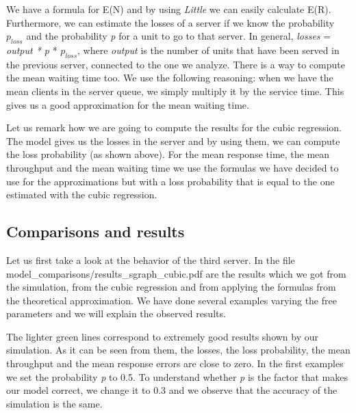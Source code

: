 \documentclass[12pt]{article}
\theoremstyle{plain}
\begin{document}
We have a formula for E(N) and by using \emph{Little} we can easily calculate
E(R). Furthermore, we can estimate the losses of a server if we know the
probability $p_{loss}$ and the probability \emph{p} for a unit to go to that
server. In general, \emph{losses} = \emph{output * p} * $p_{loss}$, where
\emph{output} is the number of units that have been served in the previous
server, connected to the one we analyze. There is a way to compute the mean
waiting time too. We use the following reasoning: when we have the mean clients
in the server queue, we simply multiply it by the service time. This gives us a
good approximation for the mean waiting time.

Let us remark how we are going to compute the results for the cubic regression.
The model gives us the losses in the server and by using them, we can compute
the loss probability (as shown above). For the mean response time, the mean
throughput and the mean waiting time we use the formulas we have decided to use
for the approximations but with a loss probability that is equal to the one
estimated with the cubic regression.

\subsection*{Comparisons and results}

Let us first take a look at the behavior of the third server. In the file
\linebreak model\_comparisons/results\_sgraph\_cubic.pdf are the results which we got from the
simulation, from the cubic regression and from applying the formulas from the
theoretical approximation. We have done several examples varying the free
parameters and we will explain the observed results.  

The lighter green lines correspond to extremely good results shown by our
simulation. As it can be seen from them, the losses, the loss probability, the
mean throughput and the mean response errors are close to zero. In the first
examples we set the probability \emph{p} to 0.5. To understand whether \emph{p}
is the factor that makes our model correct, we change it to 0.3 and we observe
that the accuracy of the simulation is the same.
\end{document}
